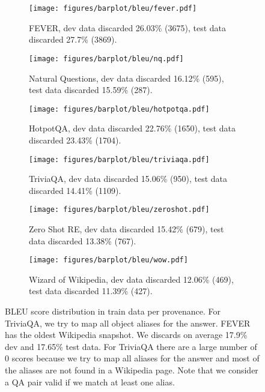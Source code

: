 \documentclass[11pt]{article}
\begin{document}
\begin{figure*}[ht]

\begin{subfigure}{.47\textwidth}
  \centering
\texttt{[image: figures/barplot/bleu/fever.pdf]}  
  \caption{FEVER, dev data discarded 26.03\% (3675), test data discarded 27.7\% (3869).}
  \label{fig:sub-FE}
\end{subfigure}\hspace{.05\textwidth}\begin{subfigure}{.47\textwidth}
  \centering
\texttt{[image: figures/barplot/bleu/nq.pdf]}  
  \caption{Natural Questions, dev data discarded 16.12\% (595), test data discarded 15.59\% (287).}
  \label{fig:sub-NQ}
\end{subfigure}

\vspace{2em}

\begin{subfigure}{.47\textwidth}
  \centering
\texttt{[image: figures/barplot/bleu/hotpotqa.pdf]}  
  \caption{HotpotQA, dev data discarded 22.76\% (1650), test data discarded 23.43\% (1704).}
  \label{fig:sub-HP}
\end{subfigure}\hspace{.05\textwidth}\begin{subfigure}{.47\textwidth}
  \centering
\texttt{[image: figures/barplot/bleu/triviaqa.pdf]}
  \caption{TriviaQA, dev data discarded 15.06\% (950), test data discarded 14.41\% (1109).}
  \label{fig:sub-TR}
\end{subfigure}

\vspace{2em}

\begin{subfigure}{.47\textwidth}
  \centering
\texttt{[image: figures/barplot/bleu/zeroshot.pdf]}  
  \caption{Zero Shot RE, dev data discarded 15.42\% (679), test data discarded 13.38\% (767).}
  \label{fig:sub-ZE}
\end{subfigure}\hspace{.05\textwidth}\begin{subfigure}{.47\textwidth}
  \centering
\texttt{[image: figures/barplot/bleu/wow.pdf]}  
  \caption{Wizard of Wikipedia, dev data discarded 12.06\% (469), test data discarded 11.39\% (427).}
  \label{fig:sub-WW}
\end{subfigure}

\caption{BLEU score distribution in train data per provenance. For TriviaQA, we try to map all object aliases for the answer. FEVER has the oldest Wikipedia snapshot. We discards on average 17.9\% dev and 17.65\% test data. For TriviaQA there are a large number of 0 scores because we try to map all aliases for the answer and most of the aliases are not found in a Wikipedia page. Note that we consider a QA pair valid if we match at least one alias.}
\label{fig:bleu}
\end{figure*} 














 
\end{document}
